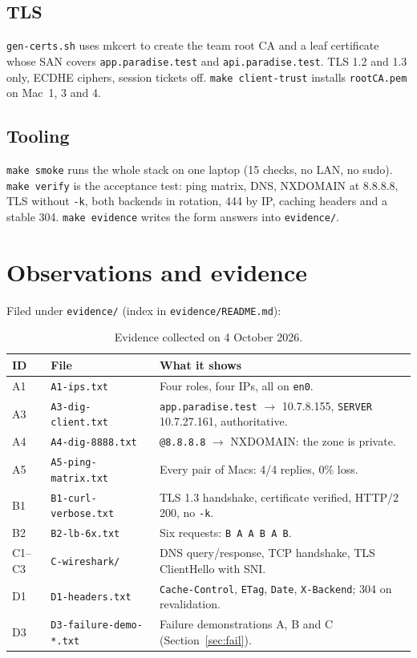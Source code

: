 \documentclass[11pt,a4paper]{article}
\begin{document}
\subsection{TLS}
\texttt{gen-certs.sh} uses mkcert to create the team root CA and a leaf certificate whose SAN covers
\texttt{app.paradise.test} and \texttt{api.paradise.test}. TLS 1.2 and 1.3 only, ECDHE ciphers,
session tickets off. \texttt{make client-trust} installs \texttt{rootCA.pem} on Mac~1, 3 and 4.

\subsection{Tooling}
\texttt{make smoke} runs the whole stack on one laptop (15 checks, no LAN, no sudo).
\texttt{make verify} is the acceptance test: ping matrix, DNS, NXDOMAIN at 8.8.8.8, TLS without
\texttt{-k}, both backends in rotation, 444 by IP, caching headers and a stable 304.
\texttt{make evidence} writes the form answers into \texttt{evidence/}.

\section{Observations and evidence}
Filed under \texttt{evidence/} (index in \texttt{evidence/README.md}):

\begin{table}[H]
\centering
\caption{Evidence collected on 4 October 2026.}
{\small
\begin{tabular}{@{}p{1.0cm}p{4.2cm}p{9.4cm}@{}}
\toprule
\textbf{ID} & \textbf{File} & \textbf{What it shows} \\
\midrule
A1 & \texttt{A1-ips.txt} & Four roles, four IPs, all on \texttt{en0}. \\
A3 & \texttt{A3-dig-client.txt} & \texttt{app.paradise.test} $\to$ 10.7.8.155, \texttt{SERVER} 10.7.27.161, authoritative. \\
A4 & \texttt{A4-dig-8888.txt} & \texttt{@8.8.8.8} $\to$ NXDOMAIN: the zone is private. \\
A5 & \texttt{A5-ping-matrix.txt} & Every pair of Macs: 4/4 replies, 0\% loss. \\
B1 & \texttt{B1-curl-verbose.txt} & TLS 1.3 handshake, certificate verified, HTTP/2 200, no \texttt{-k}. \\
B2 & \texttt{B2-lb-6x.txt} & Six requests: \texttt{B A A B A B}. \\
C1--C3 & \texttt{C-wireshark/} & DNS query/response, TCP handshake, TLS ClientHello with SNI. \\
D1 & \texttt{D1-headers.txt} & \texttt{Cache-Control}, \texttt{ETag}, \texttt{Date}, \texttt{X-Backend}; 304 on revalidation. \\
D3 & \texttt{D3-failure-demo-*.txt} & Failure demonstrations A, B and C (Section~\ref{sec:fail}). \\
\bottomrule
\end{tabular}}
\end{table}
\end{document}
